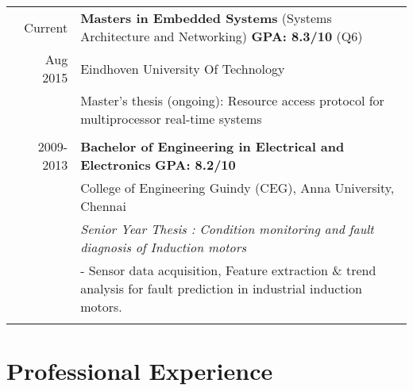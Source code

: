 \documentclass[a4paper,10pt]{article} %
\begin{document}
\begin{tabular}{rl}	
\ Current & \textbf{Masters in Embedded Systems} \footnotesize{(Systems Architecture and Networking)} \hfill \normalsize \textbf{GPA: 8.3/10}         \footnotesize{ (Q6)}\\
\ Aug 2015 & Eindhoven University Of Technology\\
& Master's thesis (ongoing): Resource access protocol for multiprocessor real-time systems\\
&\\
\ 2009-2013 & \textbf{Bachelor of Engineering in Electrical and Electronics} \hfill \textbf{GPA: 8.2/10}\\
& College of Engineering Guindy (CEG), Anna University, Chennai\\
&  \emph{Senior Year Thesis : Condition monitoring and fault diagnosis of Induction motors}\\
&  \footnotesize{ - Sensor data acquisition, Feature extraction \& trend analysis for fault prediction in industrial induction motors.}\\
&\\


\end{tabular}
\section{Professional Experience}
\end{document}
